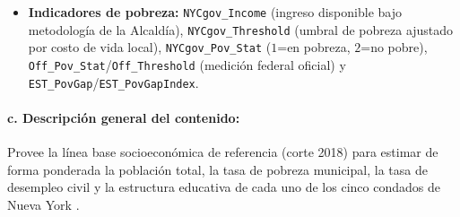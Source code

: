 \begin{itemize}
    \item \textbf{Indicadores de pobreza:} \texttt{NYCgov\_Income} (ingreso disponible bajo metodología de la Alcaldía), \texttt{NYCgov\_Threshold} (umbral de pobreza ajustado por costo de vida local), \texttt{NYCgov\_Pov\_Stat} ($1$=en pobreza, $2$=no pobre), \texttt{Off\_Pov\_Stat}/\texttt{Off\_Threshold} (medición federal oficial) y \texttt{EST\_PovGap}/\texttt{EST\_PovGapIndex}.
\end{itemize}

\paragraph{c. Descripción general del contenido:} Provee la línea base socioeconómica de referencia (corte 2018) para estimar de forma ponderada la población total, la tasa de pobreza municipal, la tasa de desempleo civil y la estructura educativa de cada uno de los cinco condados de Nueva York \cite{nyc_poverty_data_2018}.
